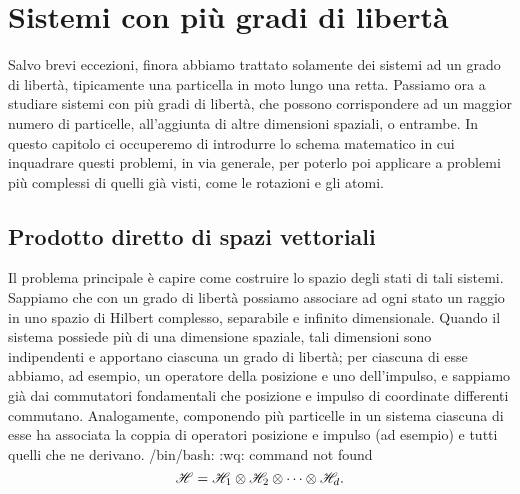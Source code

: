 \chapter{Sistemi con più gradi di libertà} \label{ch:multi}
Salvo brevi eccezioni, finora abbiamo trattato solamente dei sistemi ad un grado di libertà, tipicamente una particella in moto lungo una retta.
Passiamo ora a studiare sistemi con più gradi di libertà, che possono corrispondere ad un maggior numero di particelle, all'aggiunta di altre dimensioni spaziali, o entrambe.
In questo capitolo ci occuperemo di introdurre lo schema matematico in cui inquadrare questi problemi, in via generale, per poterlo poi applicare a problemi più complessi di quelli già visti, come le rotazioni e gli atomi.

\section{Prodotto diretto di spazi vettoriali}
Il problema principale è capire come costruire lo spazio degli stati di tali sistemi.
Sappiamo che con un grado di libertà possiamo associare ad ogni stato un raggio in uno spazio di Hilbert complesso, separabile e infinito dimensionale.
Quando il sistema possiede più di una dimensione spaziale, tali dimensioni sono indipendenti e apportano ciascuna un grado di libertà; per ciascuna di esse abbiamo, ad esempio, un operatore della posizione e uno dell'impulso, e sappiamo già dai commutatori fondamentali che posizione e impulso di coordinate differenti commutano.
Analogamente, componendo più particelle in un sistema ciascuna di esse ha associata la coppia di operatori posizione e impulso (ad esempio) e tutti quelli che ne derivano.
/bin/bash: :wq: command not found
\begin{equation}
	\mathscr H=\mathscr H_1\otimes\mathscr H_2\otimes\cdots\otimes\mathscr H_d.
\end{equation}

